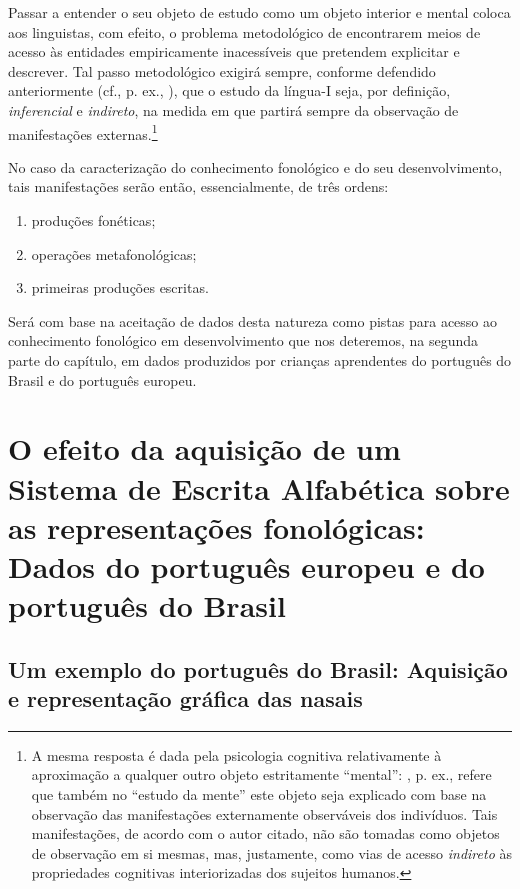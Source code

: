 \documentclass[output=paper]{LSP/langsci}
\begin{document}
Passar a entender o seu objeto de estudo como um objeto interior e mental coloca aos linguistas, com efeito, o problema metodológico de encontrarem meios de acesso às entidades empiricamente inacessíveis que pretendem explicitar e descrever. Tal passo metodológico exigirá sempre, conforme defendido anteriormente (cf., p. ex., \citealt{veloso2010}), que o estudo da língua-I seja, por definição, \textit{inferencial} e \textit{indireto}, na medida em que partirá sempre da observação de manifestações externas.\footnote{A mesma resposta é dada pela psicologia cognitiva relativamente à aproximação a qualquer outro objeto estritamente ``mental'': \citet[3]{eysenck1994}, p. ex., refere que também no ``estudo da mente'' este objeto seja explicado com base na observação das manifestações externamente observáveis dos indivíduos. Tais manifestações, de acordo com o autor citado, não são tomadas como objetos de observação em si mesmas, mas, justamente, como vias de acesso \textit{indireto} às propriedades cognitivas interiorizadas dos sujeitos humanos.}

No caso da caracterização do conhecimento fonológico e do seu desenvolvimento, tais manifestações serão então, essencialmente, de três ordens: 

\begin{enumerate}
\item produções fonéticas; 
\item operações metafonológicas; 
\item primeiras produções escritas.
\end{enumerate}

Será com base na aceitação de dados desta natureza como pistas para acesso ao conhecimento fonológico em desenvolvimento que nos deteremos, na segunda parte do capítulo, em dados produzidos por crianças aprendentes do português do Brasil e do português europeu.

\section{O efeito da aquisição de um Sistema de Escrita Alfabética sobre as representações fonológicas: Dados do português europeu e do português do Brasil}
\label{sec:miranda_dados}

\subsection{Um exemplo do português do Brasil: Aquisição e representação gráfica das nasais}
\label{subsec:miranda_exemplo_pb}
\end{document}
